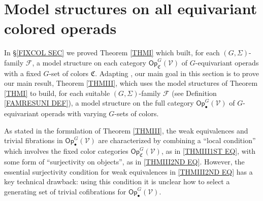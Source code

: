 \documentclass[a4paper,10pt
,draft
]{article}%
\numberwithin{equation}{section}
\numberwithin{figure}{section}
\newtheorem{corollary}[equation]{Corollary}%
\theoremstyle{definition} %
\newcommand{\vect}[1]{\text{\overrightharp{\ensuremath{#1}}}}
\DeclareMathOperator{\Aut}{Aut}%
\newcommand{\F}{\ensuremath{\mathcal F}}
\newcommand{\V}{\ensuremath{\mathcal V}}
\newcommand{\C}{\ensuremath{\mathcal C}}
\newcommand{\1}{\ensuremath{\mathbbm 1}}%
\begin{document}





















\section{Model structures on all equivariant colored operads
	}\label{MS_SEC}


\renewcommand{\C}{\mathfrak C}


In \S \ref{FIXCOL SEC} we proved Theorem \ref{THMI} which built, 
for each $(G,\Sigma)$-family $\F$,
a model structure on each category
$\mathsf{Op}_{\mathfrak{C}}^G(\V)$
of $G$-equivariant operads with a fixed $G$-set of colors $\mathfrak{C}$.
Adapting \cite{BM13,Cav,CM13b},
our main goal in this section is 
to prove our main result, Theorem \ref{THMIII},
which uses the model structures of Theorem \ref{THMI}
to build,
for each suitable $(G,\Sigma)$-family $\F$ 
(see Definition \ref{FAMRESUNI DEF}),
a model structure on the full category $\mathsf{Op}^G_\bullet(\mathcal{V})$
of $G$-equivariant operads with varying $G$-sets of colors. 


As stated in the formulation of Theorem \ref{THMIII},
the weak equivalences and trivial fibrations 
in $\mathsf{Op}^G_\bullet(\V)$
are characterized by combining
a ``local condition'' which involves the fixed color categories $\mathsf{Op}_{\mathfrak{C}}^G(\V)$,
as in \eqref{THMIII1ST EQ},
with some form of ``surjectivity on objects'',
as in \eqref{THMIII2ND EQ}.
However, the essential surjectivity condition for 
weak equivalences in \eqref{THMIII2ND EQ}
has a key technical drawback: 
using this condition 
it is unclear how to select a generating set of trivial cofibrations 
for $\mathsf{Op}^G_\bullet(\V)$.
\end{document}
